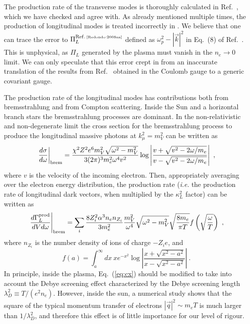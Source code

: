 \documentclass[12pt]{article}
\begin{document}
The production rate of the transverse modes is thoroughly calculated
in Ref.~\cite{Redondo:2008aa}, which we have checked and agree
with. As already mentioned multiple times, the production of
longitudinal modes is treated incorrectly in \cite{Redondo:2008aa}. We
believe that one can trace the error to $\Pi_L^{\rm Ref.\,\tiny
  \cite{Redondo:2008aa}}$ defined as $\omega_p^2-|\vec{k}|^2$ in
Eq.~(8) of Ref.~\cite{Redondo:2008aa}.  This is unphysical, as $\Pi_L$
generated by the plasma must vanish in the $n_e\to 0$ limit.  We can only speculate that this error
crept in from an inaccurate translation of the results from
Ref.~\cite{Braaten:1993jw} obtained in the Coulomb gauge to a generic
covariant gauge.

The production rate of the longitudinal modes has contributions both
from bremsstrahlung and from Compton scattering. Inside the Sun and a
horizontal branch stars the bremsstrahlung processes are dominant.  In the
non-relativistic and non-degenerate limit the cross section for the bremsstrahlung process to produce the
longitudinal massive photons at $k_\mu^2=m_V^2$ can be written as
\begin{equation}\label{eq:cx}
\left.\frac{d\sigma}{d \omega}\right|_{\rm brem} = \frac{\chi^2 Z^2 e^6 m_V^2 \sqrt{\omega^2 - m_V^2}}{ 3(2\pi)^3 m_e^2 \omega^4 v^2} \log\left|\frac{v + \sqrt{v^2 - 2 \omega/m_e}}{v - \sqrt{v^2 - 2 \omega/m_e}}\right| \ ,
\end{equation}
where $v$ is the velocity of the incoming electron. 
Then, appropriately
averaging over the electron energy distribution, the production rate 
({\em i.e.} the production rate of longitudinal dark vectors, when multiplied by the 
$\kappa^2_L$ factor)
can be written as
\begin{equation}\label{brem}
\left.\frac{d\Gamma^{\rm prod}_{L}}{dV d\omega}\right|_{\rm brem} = \sum_i\frac{8 Z_i^2 \alpha^3 n_e n_{Z_i}}{3 m_e^2} \frac{m_V^2}{\omega^4}\sqrt{\omega^2 - m_V^2} \sqrt{\frac{8 m_e}{\pi T}} f\left(\sqrt{\frac{\omega}{T}}\right) \ ,
\end{equation} 
where $n_{Z_i}$ is the number density of ions of charge $-Z_ie$, and 
\begin{equation}
f(a) = \int^\infty_a d x ~x e^{-x^2} \log\left|\frac{x+\sqrt{x^2-a^2}}{x-\sqrt{x^2-a^2}}\right| \ .
\end{equation}
In principle, inside the plasma, Eq.~(\ref{eq:cx}) should be modified to take into account the Debye screening effect characterized by the Debye screening length $\lambda_D^2 \equiv T/(e^2 n_e)$. However, inside the sun, a numerical study shows that the square of the typical momentum transfer of electrons $|\vec q|^2\sim m_e T$ is much larger than $1/\lambda_D^2$, and therefore this effect is of little importance for our level of rigour. 
\end{document}
